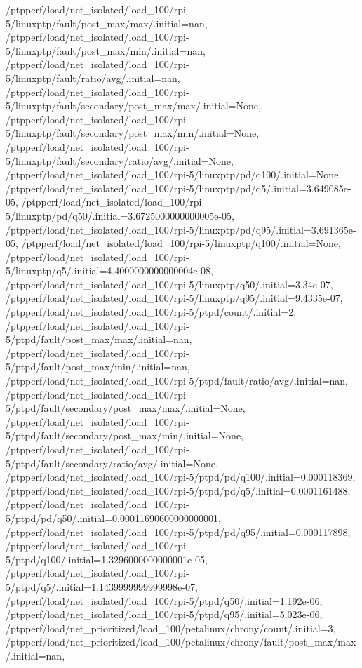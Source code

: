 {    /ptpperf/load/net_isolated/load_100/rpi-5/linuxptp/fault/post_max/max/.initial=nan,
    /ptpperf/load/net_isolated/load_100/rpi-5/linuxptp/fault/post_max/min/.initial=nan,
    /ptpperf/load/net_isolated/load_100/rpi-5/linuxptp/fault/ratio/avg/.initial=nan,
    /ptpperf/load/net_isolated/load_100/rpi-5/linuxptp/fault/secondary/post_max/max/.initial=None,
    /ptpperf/load/net_isolated/load_100/rpi-5/linuxptp/fault/secondary/post_max/min/.initial=None,
    /ptpperf/load/net_isolated/load_100/rpi-5/linuxptp/fault/secondary/ratio/avg/.initial=None,
    /ptpperf/load/net_isolated/load_100/rpi-5/linuxptp/pd/q100/.initial=None,
    /ptpperf/load/net_isolated/load_100/rpi-5/linuxptp/pd/q5/.initial=3.649085e-05,
    /ptpperf/load/net_isolated/load_100/rpi-5/linuxptp/pd/q50/.initial=3.6725000000000005e-05,
    /ptpperf/load/net_isolated/load_100/rpi-5/linuxptp/pd/q95/.initial=3.691365e-05,
    /ptpperf/load/net_isolated/load_100/rpi-5/linuxptp/q100/.initial=None,
    /ptpperf/load/net_isolated/load_100/rpi-5/linuxptp/q5/.initial=4.4000000000000004e-08,
    /ptpperf/load/net_isolated/load_100/rpi-5/linuxptp/q50/.initial=3.34e-07,
    /ptpperf/load/net_isolated/load_100/rpi-5/linuxptp/q95/.initial=9.4335e-07,
    /ptpperf/load/net_isolated/load_100/rpi-5/ptpd/count/.initial=2,
    /ptpperf/load/net_isolated/load_100/rpi-5/ptpd/fault/post_max/max/.initial=nan,
    /ptpperf/load/net_isolated/load_100/rpi-5/ptpd/fault/post_max/min/.initial=nan,
    /ptpperf/load/net_isolated/load_100/rpi-5/ptpd/fault/ratio/avg/.initial=nan,
    /ptpperf/load/net_isolated/load_100/rpi-5/ptpd/fault/secondary/post_max/max/.initial=None,
    /ptpperf/load/net_isolated/load_100/rpi-5/ptpd/fault/secondary/post_max/min/.initial=None,
    /ptpperf/load/net_isolated/load_100/rpi-5/ptpd/fault/secondary/ratio/avg/.initial=None,
    /ptpperf/load/net_isolated/load_100/rpi-5/ptpd/pd/q100/.initial=0.000118369,
    /ptpperf/load/net_isolated/load_100/rpi-5/ptpd/pd/q5/.initial=0.0001161488,
    /ptpperf/load/net_isolated/load_100/rpi-5/ptpd/pd/q50/.initial=0.00011690600000000001,
    /ptpperf/load/net_isolated/load_100/rpi-5/ptpd/pd/q95/.initial=0.000117898,
    /ptpperf/load/net_isolated/load_100/rpi-5/ptpd/q100/.initial=1.3296000000000001e-05,
    /ptpperf/load/net_isolated/load_100/rpi-5/ptpd/q5/.initial=1.1439999999999998e-07,
    /ptpperf/load/net_isolated/load_100/rpi-5/ptpd/q50/.initial=1.192e-06,
    /ptpperf/load/net_isolated/load_100/rpi-5/ptpd/q95/.initial=5.023e-06,
    /ptpperf/load/net_prioritized/load_100/petalinux/chrony/count/.initial=3,
    /ptpperf/load/net_prioritized/load_100/petalinux/chrony/fault/post_max/max/.initial=nan,
}
